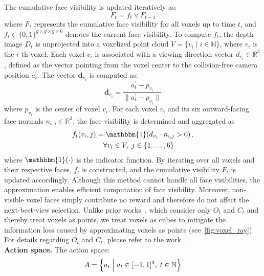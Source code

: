The cumulative face visibility is updated iteratively as: %
\begin{equation}
 F_t = f_t \lor F_{t-1}
\end{equation}  
where $F_t$ represents the cumulative face visibility for all voxels up to time $t$, and $f_t \in \{0, 1\}^{g \times g \times g \times 6}$ denotes the current face visibility.
To compute $f_t$, the depth image $D_t$ is unprojected into a voxelized point cloud $V = \{v_i \;|\; i \in \mathbb{N}\}$, where $v_i$ is the $i$-th voxel. 
Each voxel $v_i$ is associated with a viewing direction vector $d_{v_i} \in \mathbb{R}^3$, defined as the vector pointing from the voxel center to the collision-free camera position $a^{'}_{t}$. 
The vector $\mathbf{d}_{v_i}$ is computed as: %
\begin{equation}
\mathbf{d}_{v_i} = \frac{a^{'}_{t} - p_{v_i}}{\|a^{'}_{t} - p_{v_i}\|}
\end{equation}  
where $p_{v_i}$ is the center of voxel $v_i$.
For each voxel $v_i$ and its six outward-facing face normals $n_{i,j} \in \mathbb{R}^3$, the face visibility is determined and aggregated as
\begin{align}
f_t(v_i, j) &= \mathbbm{1}\!\left(d_{v_i} \cdot n_{i,j} > 0\right), \notag \\
&\quad \forall v_i \in V, \; j \in \{1, \dots, 6\}
\end{align}
where $\mathbbm{1}(\cdot)$ is the indicator function.
By iterating over all voxels and their respective faces, $f_t$ is constructed, and the cumulative visibility $F_t$ is updated accordingly.
Although this method cannot handle all face visibilities, the approximation enables efficient computation of face visibility.
Moreover, non-visible voxel faces simply contribute no reward and therefore do not affect the next-best-view selection.
Unlike prior works~\cite{chen2024gennbv}, which consider only $O_t$ and $C_t$ and thereby treat voxels as points, we treat voxels as cubes to mitigate the information loss caused by approximating voxels as points (see~\cref{fig:voxel_ray}).
For details regarding $O_t$ and $C_t$, please refer to the work~\cite{chen2024gennbv}.
\\
\textbf{Action space.} The action space: %
\begin{equation}
A = \Bigl\{ a_t \;\Big|\; a_t \in [-1, 1]^3, \; t \in \mathbb{N} \Bigr\}
\end{equation}
